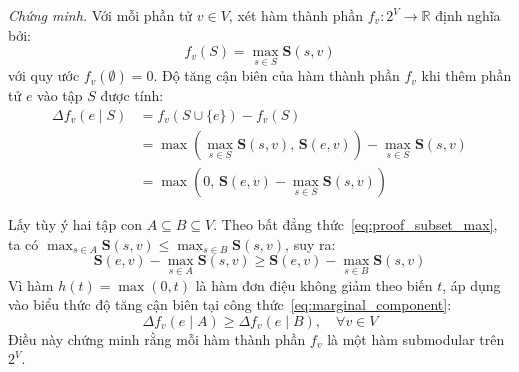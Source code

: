 \noindent\textit{Chứng minh.} Với mỗi phần tử $v \in V$, xét hàm thành phần $f_v: 2^V \to \mathbb{R}$ định nghĩa bởi:
\begin{equation}
f_v(S) = \max_{s \in S} \mathbf{S}(s, v)
\end{equation}
với quy ước $f_v(\emptyset) = 0$. Độ tăng cận biên của hàm thành phần $f_v$ khi thêm phần tử $e$ vào tập $S$ được tính:
\begin{align}
\Delta f_v(e \mid S) &= f_v(S \cup \{e\}) - f_v(S) \nonumber \\
&= \max\left(\max_{s \in S} \mathbf{S}(s, v), \, \mathbf{S}(e, v)\right) - \max_{s \in S} \mathbf{S}(s, v) \nonumber \\
&= \max\left(0, \, \mathbf{S}(e, v) - \max_{s \in S} \mathbf{S}(s, v)\right)
\label{eq:marginal_component}
\end{align}

Lấy tùy ý hai tập con $A \subseteq B \subseteq V$. Theo bất đẳng thức~\eqref{eq:proof_subset_max}, ta có $\max_{s \in A} \mathbf{S}(s, v) \le \max_{s \in B} \mathbf{S}(s, v)$, suy ra:
\begin{equation}
\mathbf{S}(e, v) - \max_{s \in A} \mathbf{S}(s, v) \ge \mathbf{S}(e, v) - \max_{s \in B} \mathbf{S}(s, v)
\end{equation}
Vì hàm $h(t) = \max(0, t)$ là hàm đơn điệu không giảm theo biến $t$, áp dụng vào biểu thức độ tăng cận biên tại công thức~\eqref{eq:marginal_component}:
\begin{equation}
\label{eq:component_submodularity}
\Delta f_v(e \mid A) \ge \Delta f_v(e \mid B), \quad \forall v \in V
\end{equation}
Điều này chứng minh rằng mỗi hàm thành phần $f_v$ là một hàm submodular trên $2^V$.

